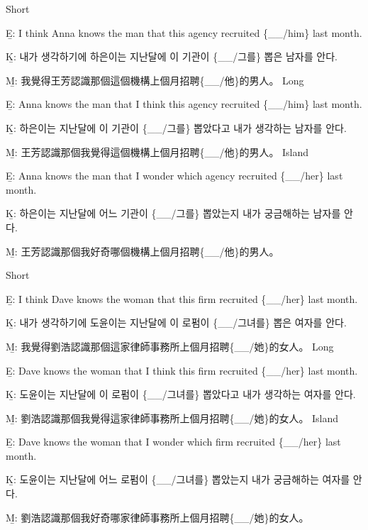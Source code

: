 \pex %
\a Short\par\nobreak
\beginsubsub
\b{E:} I think Anna knows the man that this agency recruited \{\_\_/him\} last month.\par\nobreak
\b{K:} \ko 내가 생각하기에 하은이는 지난달에 이 기관이 \{\_\_/그를\} 뽑은 남자를 안다. \normalfont\par\nobreak
\b{M:} \zh 我覺得王芳認識那個這個機構上個月招聘\{\_\_/他\}的男人。 \normalfont
\endsubsub
\a Long\par\nobreak
\beginsubsub
\b{E:} Anna knows the man that I think this agency recruited \{\_\_/him\} last month.\par\nobreak
\b{K:} \ko 하은이는 지난달에 이 기관이 \{\_\_/그를\} 뽑았다고 내가 생각하는 남자를 안다. \normalfont\par\nobreak
\b{M:} \zh 王芳認識那個我覺得這個機構上個月招聘\{\_\_/他\}的男人。 \normalfont
\endsubsub
\a Island\par\nobreak
\beginsubsub
\b{E:} Anna knows the man that I wonder which agency recruited \{\_\_/her\} last month.\par\nobreak
\b{K:} \ko 하은이는 지난달에 어느 기관이 \{\_\_/그를\} 뽑았는지 내가 궁금해하는 남자를 안다\normalfont.\par\nobreak
\b{M:} \zh 王芳認識那個我好奇哪個機構上個月招聘\{\_\_/他\}的男人。\normalfont
\endsubsub
\xe

\pex %
\a Short\par\nobreak
\beginsubsub
\b{E:} I think Dave knows the woman that this firm recruited \{\_\_/her\} last month.\par\nobreak
\b{K:} \ko 내가 생각하기에 도윤이는 지난달에 이 로펌이 \{\_\_/그녀를\} 뽑은 여자를 안다. \normalfont\par\nobreak
\b{M:} \zh 我覺得劉浩認識那個這家律師事務所上個月招聘\{\_\_/她\}的女人。 \normalfont
\endsubsub
\a Long\par\nobreak
\beginsubsub
\b{E:} Dave knows the woman that I think this firm recruited \{\_\_/her\} last month.\par\nobreak
\b{K:} \ko 도윤이는 지난달에 이 로펌이 \{\_\_/그녀를\} 뽑았다고 내가 생각하는 여자를 안다. \normalfont\par\nobreak
\b{M:} \zh 劉浩認識那個我覺得這家律師事務所上個月招聘\{\_\_/她\}的女人。 \normalfont
\endsubsub
\a Island\par\nobreak
\beginsubsub
\b{E:} Dave knows the woman that I wonder which firm recruited \{\_\_/her\} last month.\par\nobreak
\b{K:} \ko 도윤이는 지난달에 어느 로펌이 \{\_\_/그녀를\} 뽑았는지 내가 궁금해하는 여자를 안다\normalfont.\par\nobreak
\b{M:} \zh 劉浩認識那個我好奇哪家律師事務所上個月招聘\{\_\_/她\}的女人。\normalfont
\endsubsub
\xe

